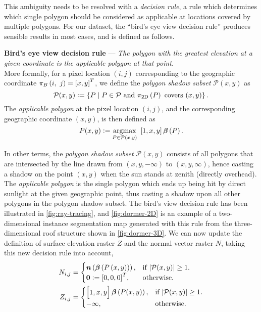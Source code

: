 This ambiguity needs to be resolved with a \textit{decision rule}, a rule which determines which single polygon should be considered as applicable at locations covered by multiple polygons.
For our dataset, the \enquote{bird's eye view decision rule} produces sensible results in most cases, and is defined as follows.
%
\begin{framed}
  \noindent
  \textbf{Bird's eye view decision rule}
  ---
  \textit{The polygon with the greatest elevation at a given coordinate is the applicable polygon at that point.}
  \\
  More formally, for a pixel location $(i, j)$ corresponding to the geographic coordinate $\pi_{B}\left(i,~j\right) = {[x, y]}^T$, we define the \textit{polygon shadow subset} $\mathcal{P}(x, y)$ as
  \begin{equation*}
    \mathcal{P}(x, y)
    \vcentcolon=
    \left\{
      P
      \mid
      P \in \mathcal{P}
      \text{ and }
      \pi_{\mathrm{2D}}\left(P\right) \text{ covers } (x, y)
    \right\}.
  \end{equation*}
  The \textit{applicable polygon} at the pixel location $(i, j)$, and the corresponding geographic coordinate $(x, y)$, is then defined as
  \begin{equation*}
    P(x, y)
    \vcentcolon=
    \operatorname*{\arg\!\max}_{P \in \mathcal{P}(x, y)}~
    \left[1, x, y\right] \boldsymbol{\beta}\left(P\right).
  \end{equation*}
  \vspace{-1.5em}
\end{framed}
%
In other terms, the \textit{polygon shadow subset} $\mathcal{P}(x, y)$ consists of all polygons that are intersected by the line drawn from $(x, y, -\infty)$ to $(x, y, \infty)$, hence casting a shadow on the point $(x, y)$ when the sun stands at zenith (directly overhead).
The \textit{applicable polygon} is the single polygon which ends up being hit by direct sunlight at the given geographic point, thus casting a shadow upon all other polygons in the polygon shadow subset.
The bird's view decision rule has been illustrated in \cref{fig:ray-tracing}, and \cref{fig:dormer-2D} is an example of a two-dimensional instance segmentation map generated with this rule from the three-dimensional roof structure shown in \cref{fig:dormer-3D}.
We can now update the definition of surface elevation raster $Z$ and the normal vector raster $N$, taking this new decision rule into account,
\begin{align*}
  N_{i,j} &= \begin{cases}
    \boldsymbol{n}\left(\boldsymbol{\beta}\left(P\left(x, y\right)\right)\right), &\text{if $|\mathcal{P}(x,y)| \geq 1$}.\\
    \boldsymbol{0} \vcentcolon= {[0, 0, 0]}^T, &\text{otherwise.}
  \end{cases}
  \\
  Z_{i,j} &= \begin{cases}
    \begin{bmatrix}1, x, y\end{bmatrix} \boldsymbol{\beta}\left(P(x, y)\right), &\text{if } |\mathcal{P}(x,y)| \geq 1.\\
    -\infty, &\text{otherwise}.
  \end{cases}
\end{align*}

